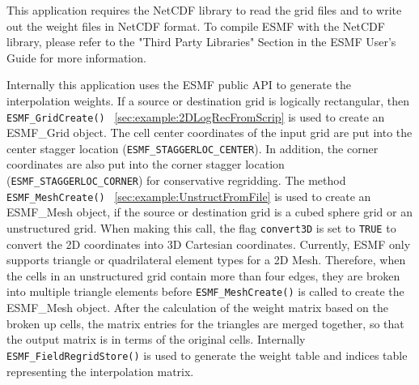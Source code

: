 This application requires the NetCDF library to read the grid files and to write out the weight files in NetCDF format.  To compile ESMF with
the NetCDF library, please refer to the "Third Party Libraries" Section in the ESMF User's Guide for more information.

Internally this application uses the ESMF public API to generate the interpolation weights.
If a source or destination grid is logically rectangular, then {\tt ESMF\_GridCreate()}
~\ref{sec:example:2DLogRecFromScrip}
is used to create an ESMF\_Grid object. The cell center
coordinates of the input grid are put into the center stagger location ({\tt ESMF\_STAGGERLOC\_CENTER}).
In addition, the corner coordinates are also put into the corner stagger location
({\tt ESMF\_STAGGERLOC\_CORNER}) for conservative regridding.  The method
{\tt ESMF\_MeshCreate()}
~\ref{sec:example:UnstructFromFile}
is used to create an ESMF\_Mesh object, if the
 source or destination grid is a cubed sphere grid or an unstructured grid. When making this call,
the flag {\tt convert3D} is set to {\tt TRUE} to convert the 2D coordinates into 3D Cartesian coordinates. Currently, ESMF only supports
triangle or quadrilateral element types for a 2D Mesh.  Therefore, when the cells in an unstructured grid contain more than four edges, they are broken into multiple triangle elements before {\tt ESMF\_MeshCreate()} is called to create the ESMF\_Mesh object. After the calculation of the weight matrix based on the broken up
cells, the matrix entries for the triangles are merged together, so that the output matrix is in terms of the original cells.
Internally {\tt ESMF\_FieldRegridStore()} is used to generate the weight table and indices table representing the interpolation matrix.

